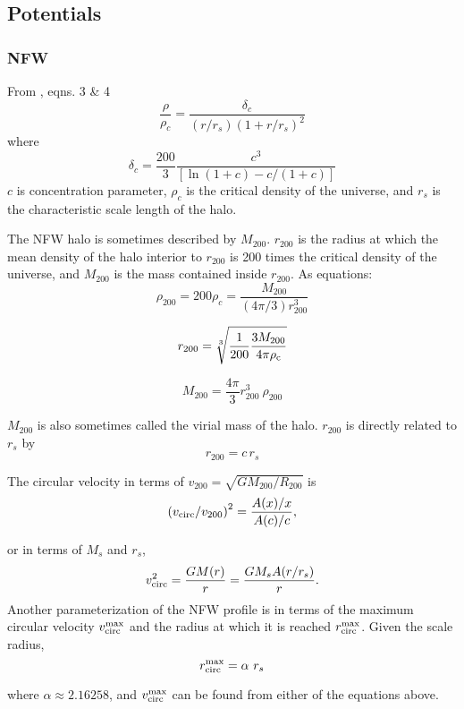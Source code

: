 \subsection{Potentials}\label{potentials}

\subsubsection{NFW}\label{nfw}

From \citet{nfw1996}, eqns. 3 \& 4 \begin{equation}{
\frac{\rho}{\rho_c} = \frac{\delta_c}{(r/r_s)(1+r/r_s)^2}
}\end{equation} where \begin{equation}{
\delta_c = \frac{200}{3}\frac{c^3}{[\ln(1+c)-c/(1+c)]}
}\end{equation} \(c\) is concentration parameter, \(\rho_c\) is the
critical density of the universe, and \(r_s\) is the characteristic
scale length of the halo.

The NFW halo is sometimes described by \(M_{200}\). \(r_{200}\) is the
radius at which the mean density of the halo interior to \(r_{200}\) is
200 times the critical density of the universe, and \(M_{200}\) is the
mass contained inside \(r_{200}\). As equations: \begin{equation}{
\rho_{200} = 200\rho_{c} = \frac{M_{200}}{(4\pi/3) r_{200}^3}
}\end{equation}

\begin{equation}{
r_{200} = \sqrt[3]{\frac{1}{200}\frac{3M_{200}}{4\pi \rho_{\rm c
}}}
}\end{equation}

\begin{equation}{
M_{200} = \frac{4\pi}{3} r_{200}^3\ \rho_{200}
}\end{equation}

\(M_{200}\) is also sometimes called the virial mass of the halo.
\(r_{200}\) is directly related to \(r_s\) by \begin{equation}{
r_{200} = c\,r_s
}\end{equation}

The circular velocity in terms of
\(v_{200} = \sqrt{G M_{200} / R_{200}}\) is \begin{equation}{
\left(v_{\rm circ}/v_{200}\right)^2 = \frac{A(x)/x}{A(c)/c},
}\end{equation}

or in terms of \(M_s\) and \(r_s\), \begin{equation}{
v_{\rm circ}^2 = \frac{G M(r)}{r} = \frac{G M_s A(r/r_s)}{r}.
}\end{equation} Another parameterization of the NFW profile is in terms
of the maximum circular velocity \(v_{\rm circ}^{\rm max}\) and the
radius at which it is reached \(r_{\rm circ}^{\rm max}\). Given the
scale radius, \begin{equation}{
r_{\rm circ}^{\rm max} = \alpha\ r_s
}\end{equation}

where \(\alpha\approx2.16258\), and \(v_{\rm circ}^{\rm max}\) can be
found from either of the equations above.
